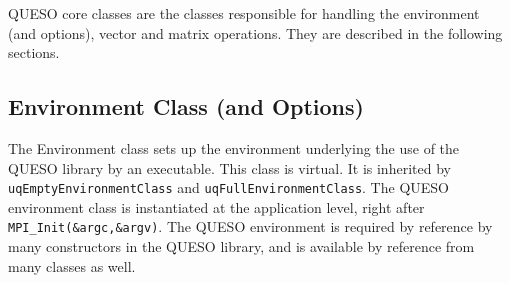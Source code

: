 QUESO core classes are the classes responsible for handling the environment (and options), vector
and matrix operations. They are described in the following sections.

% 
% 
% 
% 
% 
% 


\subsection{Environment Class (and Options)}\label{sec:environment_class}

%
The Environment class sets up the environment underlying the use of the QUESO library by an executable.
This class is virtual. It is inherited by \verb+uqEmptyEnvironmentClass+ and \verb+uqFullEnvironmentClass+.
    The QUESO environment class is instantiated at the application level, right after \verb+MPI_Init(&argc,&argv)+. 
    The QUESO environment is required by reference by many constructors in the QUESO library, and is available by reference from many classes as well.

